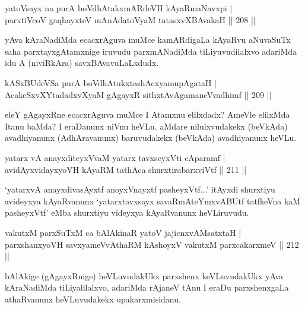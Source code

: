 \begin{shl}
yatoV\s sayx na purA boVdhAtakxmARdeVH kAyaRmaNavxpi |\\
parxtiVcoV gaqhayxteV mAnAdatoV\s yaM tatasxvXBAvakaH \hfill || 208 ||
\end{shl}

\begin{artha}
yAva kAraNadiMda ecacxrAguva muMce kamARdigaLa kAyaRvu aNuvaSuTx saha parxtayxgAtamxnige iruvudu parxmANadiMda tiLiyuvudilalxvo adariMda idu A (niviRkAra) savxBAvavuLaLxdudx.
\end{artha}


\begin{shl}
kASxBUdeVSa purA boVdhAtukxtashAcxyamupAgataH |\\
AcakeSxvXYtadadxvXyaM gAgayxR sithxtAvAgamaneV\s vadhimf \hfill || 209 ||
\end{shl}

\begin{artha}
eleY gAgayxRne ecacxrAguva muMce I Atamxnu elilxdadx? AmeVle elilxMda Itanu baMda? I eraDanunx niVnu heVLu. aMdare nilulxvudakekx (beVkAda) avadhiyanunx (AdhAravanunx) baruvudakekx (beVkAda) avadhiyanunx heVLu.
\end{artha}


\begin{shl}
yatarx vA anayxditeyxVvaM yatarx tavxseyxVti cAparamf |\\
avidAyxvidayxyoVH kAyaRM tathAca shurxtirabarxviVtf \hfill || 211 ||
\end{shl}

\begin{artha}
`yatarxvA anayxdivasAyxtf anoyxV\s nayxtf pasheyxVtf...' itAyxdi shurxtiyu avideyxya kAyaRvanunx `yatarxtavxsayx savaRmAteYmxvABUtf tatfkeVna kaM pasheyxVtf' eMba shurxtiyu videyxya kAyaRvanunx heVLiruvudu.
\end{artha}

\begin{shl}
vakutxM parxSuTxM ca bAlAkinaR yatoV jajicnxvAMsatxtaH |\\
parxshanxyoVH savxyameVvAthaRM kAshoyxV vakutxM parxcakarxmeV \hfill || 212 ||
\end{shl}

\begin{artha}
bAlAkige (gAgayxRnige) heVLuvudakUkx parxshenx keVLuvudakUkx yAva kAraNadiMda tiLiyalilalxvo, adariMda rAjaneV tAnu I eraDu parxshenxgaLa athaRvanunx heVLuvudakekx upakarxmisidanu.
\end{artha}

